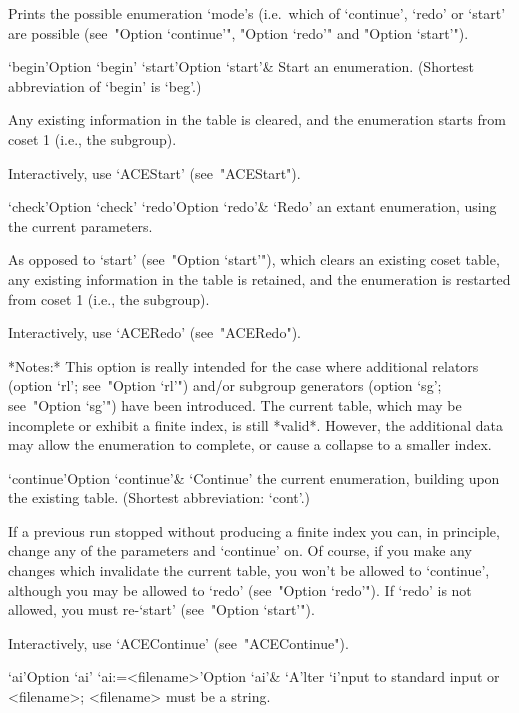 Prints the possible enumeration  `mode's  (i.e.~which  of  `continue',
`redo' or  `start'  are  possible  (see~"Option  `continue'",  "Option
`redo'" and "Option `start'").

\>`begin'{Option `begin'}
\>`start'{Option `start'}&
Start an enumeration. (Shortest abbreviation of `begin' is `beg'.)

Any existing information in the table is cleared, and the  enumeration
starts from coset 1 (i.e., the subgroup).

Interactively, use `ACEStart' (see~"ACEStart").

\>`check'{Option `check'}
\>`redo'{Option `redo'}&
`Redo' an extant enumeration, using the current parameters.

As opposed to `start' (see~"Option `start'"), which clears an existing
coset table, any existing information in the table  is  retained,  and
the enumeration is restarted from coset 1 (i.e., the subgroup).

Interactively, use `ACERedo' (see~"ACERedo").

*Notes:*
This option is really intended for the case where additional  relators
(option `rl'; see~"Option `rl'") and/or  subgroup  generators  (option
`sg'; see~"Option `sg'") have  been  introduced.  The  current  table,
which may be incomplete or exhibit a finite index, is  still  *valid*.
However, the additional data may allow the enumeration to complete, or
cause a collapse to a smaller index.

\>`continue'{Option `continue'}&
`Continue' the current enumeration, building upon the existing table.
(Shortest abbreviation: `cont'.)

If a previous run stopped without producing a finite index you can, in
principle, change any of the parameters and `continue' on. Of  course,
if you make any changes which invalidate the current table, you  won't
be allowed to `continue',  although  you  may  be  allowed  to  `redo'
(see~"Option `redo'"). If `redo' is not allowed, you  must  re-`start'
(see~"Option `start'").

Interactively, use `ACEContinue' (see~"ACEContinue").

\enditems


\beginitems

\>`ai'{Option `ai'}
\>`ai:=<filename>'{Option `ai'}&
`A'lter `i'nput to standard input or <filename>; <filename> must be  a
string.

